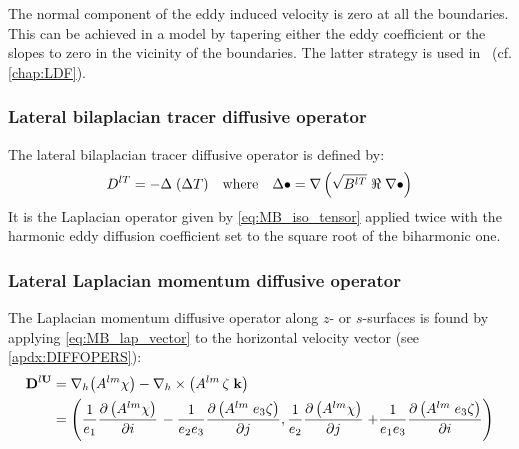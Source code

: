 \documentclass[../main/NEMO_manual]{subfiles}
\begin{document}
The normal component of the eddy induced velocity is zero at all the boundaries.
This can be achieved in a model by tapering either the eddy coefficient or the slopes to zero in
the vicinity of the boundaries.
The latter strategy is used in \NEMO\ (cf. \autoref{chap:LDF}).

\subsubsection{Lateral bilaplacian tracer diffusive operator}

The lateral bilaplacian tracer diffusive operator is defined by:
\[
  D^{lT}= - \Delta \; (\Delta T) \quad \text{where} \quad
  \Delta \bullet = \nabla \lt( \sqrt{B^{lT}} \; \Re \; \nabla \bullet \rt)
\]
It is the Laplacian operator given by \autoref{eq:MB_iso_tensor} applied twice with
the harmonic eddy diffusion coefficient set to the square root of the biharmonic one.

\subsubsection{Lateral Laplacian momentum diffusive operator}

The Laplacian momentum diffusive operator along $z$- or $s$-surfaces is found by
applying \autoref{eq:MB_lap_vector} to the horizontal velocity vector (see \autoref{apdx:DIFFOPERS}):
\begin{align*}
  \vect D^{l \vect U} &=   \nabla_h        \big( A^{lm}    \chi             \big)
                         - \nabla_h \times \big( A^{lm} \, \zeta \; \vect k \big) \\
                      &= \lt(   \frac{1}{e_1}     \pd[ \lt( A^{lm}    \chi      \rt) ]{i} \rt.
                              - \frac{1}{e_2 e_3} \pd[ \lt( A^{lm} \; e_3 \zeta \rt) ]{j} ,
                                \frac{1}{e_2}     \pd[ \lt( A^{lm}    \chi      \rt) ]{j}
                         \lt. + \frac{1}{e_1 e_3} \pd[ \lt( A^{lm} \; e_3 \zeta \rt) ]{i} \rt)
\end{align*}
\end{document}
